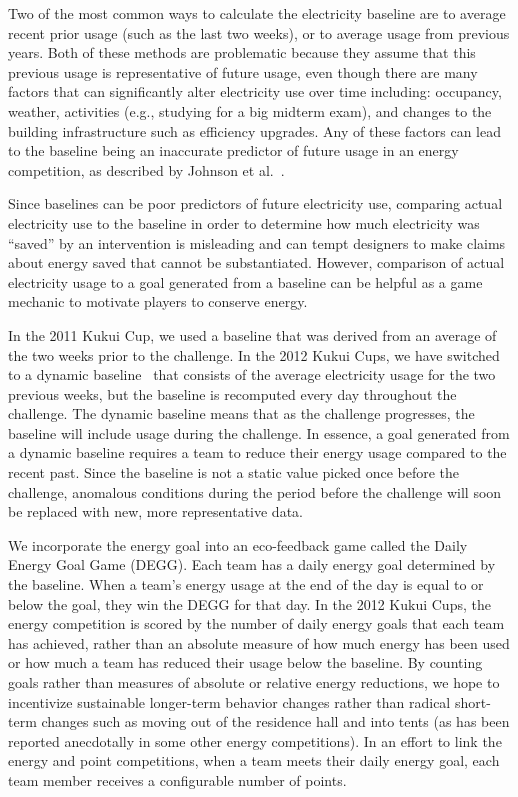 \documentclass{sigchi}
\begin{document}
Two of the most common ways to calculate the electricity baseline are to average recent prior usage (such as the last two weeks), or to average usage from previous years. Both of these methods are problematic because they assume that this previous usage is representative of future usage, even though there are many factors that can significantly alter electricity use over time including: occupancy, weather, activities (e.g., studying for a big midterm exam), and changes to the building infrastructure such as efficiency upgrades. Any of these factors can lead to the baseline being an inaccurate predictor of future usage in an energy competition, as described by Johnson et al.~\cite{csdl2-12-08}.

Since baselines can be poor predictors of future electricity use, comparing actual electricity use to the baseline in order to determine how much electricity was ``saved'' by an intervention is misleading and can tempt designers to make claims about energy saved that cannot be substantiated. However, comparison of actual electricity usage to a goal generated from a baseline can be helpful as a game mechanic to motivate players to conserve energy.

In the 2011 Kukui Cup, we used a baseline that was derived from an average of the two weeks prior to the challenge. In the 2012 Kukui Cups, we have switched to a dynamic baseline~\cite{csdl2-12-08} that consists of the average electricity usage for the two previous weeks, but the baseline is recomputed every day throughout the challenge. The dynamic baseline means that as the challenge progresses, the baseline will include usage during the challenge. In essence, a goal generated from a dynamic baseline requires a team to reduce their energy usage compared to the recent past. Since the baseline is not a static value picked once before the challenge, anomalous conditions during the period before the challenge will soon be replaced with new, more representative data.

We incorporate the energy goal into an eco-feedback game called the Daily Energy Goal Game (DEGG). Each team has a daily energy goal determined by the baseline. When a team's energy usage at the end of the day is equal to or below the goal, they win the DEGG for that day. In the 2012 Kukui Cups, the energy competition is scored by the number of daily energy goals that each team has achieved, rather than an absolute measure of how much energy has been used or how much a team has reduced their usage below the baseline. By counting goals rather than measures of absolute or relative energy reductions, we hope to incentivize sustainable longer-term behavior changes rather than radical short-term changes such as moving out of the residence hall and into tents (as has been reported anecdotally in some other energy competitions). In an effort to link the energy and point competitions, when a team meets their daily energy goal, each team member receives a configurable number of points.
\end{document}
